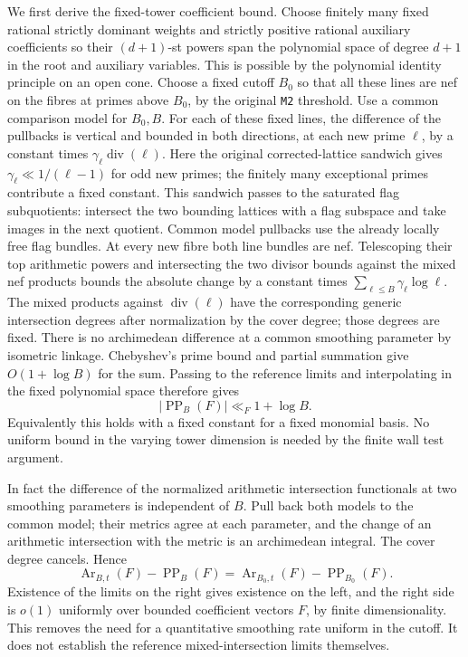 We first derive the fixed-tower coefficient bound. Choose
finitely many fixed rational strictly dominant weights
and strictly positive rational auxiliary coefficients
so their \((d+1)\)-st powers span the polynomial space of
degree \(d+1\) in the root and auxiliary variables. This
is possible by the polynomial identity principle on an
open cone. Choose a fixed cutoff \(B_0\) so that all these
lines are nef on the fibres at primes above \(B_0\), by
the original \texttt{M2} threshold. Use a common comparison
model for \(B_0,B\). For each of these fixed lines, the
difference of the pullbacks is vertical and bounded in
both directions, at each new prime \(\ell\), by a constant
times \(\gamma_\ell\operatorname{div}(\ell)\).
Here the original corrected-lattice sandwich gives
\(\gamma_\ell\ll1/(\ell-1)\) for odd new primes; the finitely
many exceptional primes contribute a fixed constant.
This sandwich passes to the saturated flag subquotients:
intersect the two bounding lattices with a flag subspace
and take images in the next quotient. Common model
pullbacks use the already locally free flag bundles.
At every new fibre both line bundles are nef.
Telescoping their top arithmetic powers and intersecting
the two divisor bounds against the mixed nef products
bounds the absolute change by a constant times
\(\sum_{\ell\le B}\gamma_\ell\log\ell\).
The mixed products against \(\operatorname{div}(\ell)\)
have the corresponding generic intersection degrees after
normalization by the cover degree; those degrees are fixed.
There is no archimedean difference at a common smoothing
parameter by isometric linkage. Chebyshev's prime bound
and partial summation give \(O(1+\log B)\) for the sum.
Passing to the reference limits and interpolating in the
fixed polynomial space therefore gives
\[
               |\operatorname{PP}_B(F)|\ll_F1+\log B.   \tag{LW5}
\]
Equivalently this holds with a fixed constant for a fixed
monomial basis. No uniform bound in the varying tower
dimension is needed by the finite wall test argument.

In fact the difference of the normalized arithmetic
intersection functionals at two smoothing parameters is
independent of \(B\). Pull back both models to the common
model; their metrics agree at each parameter, and the
change of an arithmetic intersection with the metric is
an archimedean integral. The cover degree cancels.
Hence
\[
 \operatorname{Ar}_{B,t}(F)-\operatorname{PP}_B(F)
   =\operatorname{Ar}_{B_0,t}(F)-\operatorname{PP}_{B_0}(F).
                                                               \tag{LW6}
\]
Existence of the limits on the right gives existence on
the left, and the right side is \(o(1)\) uniformly over
bounded coefficient vectors \(F\), by finite dimensionality.
This removes the need for a quantitative smoothing rate
uniform in the cutoff. It does not establish the reference
mixed-intersection limits themselves.

